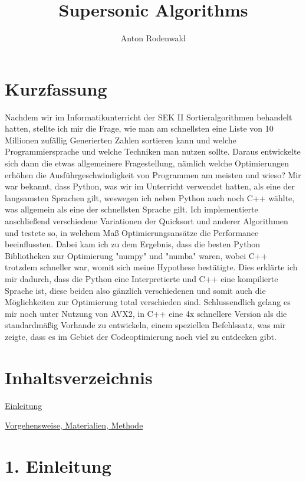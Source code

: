 \documentclass[12pt,a4paper]{article}
\begin{document}
\title{Supersonic Algorithms}
\author{Anton Rodenwald}

\maketitle

\clearpage
\section*{Kurzfassung}
Nachdem wir im Informatikunterricht der SEK II Sortieralgorithmen behandelt hatten,
stellte ich mir die Frage, wie man am schnellsten eine Liste von 10 Millionen zufällig Generierten Zahlen
sortieren kann und welche Programmiersprache und welche Techniken man nutzen sollte.
Daraus entwickelte sich dann die etwas allgemeinere Fragestellung, nämlich welche Optimierungen
erhöhen die Ausführgeschwindigkeit von Programmen am meisten und wieso?
Mir war bekannt, dass Python, was wir im Unterricht verwendet hatten, als eine der langsamsten Sprachen gilt, 
weswegen ich neben Python auch noch C++ wählte, was allgemein als eine der schnellsten Sprache gilt.
Ich implementierte anschließend verschiedene Variationen der Quicksort und anderer Algorithmen und testete so, 
in welchem Maß Optimierungsansätze die Performance beeinflussten.
Dabei kam ich zu dem Ergebnis, dass die besten Python Bibliotheken zur Optimierung "numpy" und "numba" waren,
wobei C++ trotzdem schneller war, womit sich meine Hypothese bestätigte.
Dies erklärte ich mir dadurch, dass die Python eine Interpretierte und C++ eine kompilierte Sprache ist, diese
beiden also gänzlich verschiedenen und somit auch die Möglichkeiten zur Optimierung total verschieden sind.
Schlussendlich gelang es mir noch unter Nutzung von AVX2, in C++ eine 4x schnellere Version als die standardmäßig 
Vorhande zu entwickeln, einem speziellen Befehlssatz, was mir zeigte, dass es im Gebiet der Codeoptimierung
noch viel zu entdecken gibt.

\clearpage
\section*{Inhaltsverzeichnis}

\hyperref[sec:einleitung]{Einleitung}

\hyperref[sec:methode]{Vorgehensweise, Materialien, Methode}

\clearpage
\section*{1. Einleitung}
\label{sec:einleitung}
\end{document}
